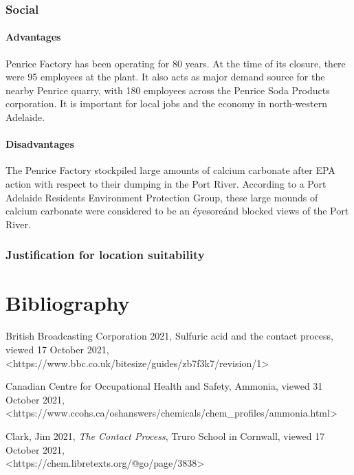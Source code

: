\documentclass[12pt, a4paper]{article}
\begin{document}
\subsubsection{Social}

\paragraph{Advantages}
Penrice Factory has been operating for 80 years. At the time of its closure, there were 95 employees at the plant. It also acts as major demand source for the nearby Penrice quarry, with 180 employees across the Penrice Soda Products corporation. It is important for local jobs and the economy in north-western Adelaide.

\paragraph{Disadvantages}

The Penrice Factory stockpiled large amounts of calcium carbonate after EPA action with respect to their dumping in the Port River. According to a Port Adelaide Residents Environment Protection Group, these large mounds of calcium carbonate were considered to be an \'eyesore\' and blocked views of the Port River. 

\subsubsection{Justification for location suitability}


\pagebreak

\section{Bibliography}

British Broadcasting Corporation 2021, Sulfuric acid and the contact process, viewed 17 October 2021, \\ \textless{https://www.bbc.co.uk/bitesize/guides/zb7f3k7/revision/1}\textgreater

Canadian Centre for Occupational Health and Safety, Ammonia, viewed 31 October 2021, \\ \textless{https://www.ccohs.ca/oshanswers/chemicals/chem\_profiles/ammonia.html}\textgreater

Clark, Jim 2021, \emph{The Contact Process}, Truro School in Cornwall, viewed 17 October 2021, \\ \textless{https://chem.libretexts.org/@go/page/3838}\textgreater
\end{document}
